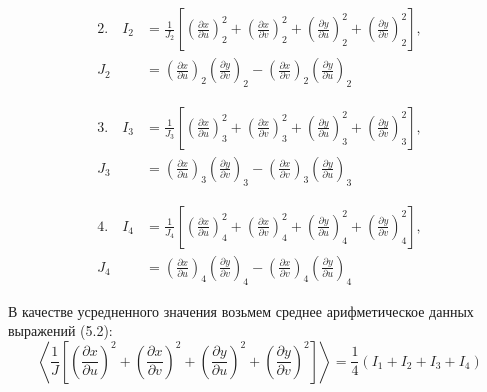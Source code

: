 \documentclass[a4paper,14pt,russian]{extreport}
\renewcommand{\_}{\kern-1.5pt\textunderscore\kern-1.5pt}
\begin{document}
\begin{align}
2. \quad I_2 &= \frac{1}{J_2}\left[\left(\frac{\partial x}{\partial u}\right)_2^2 + \left(\frac{\partial x}{\partial v}\right)_2^2 + \left(\frac{\partial y}{\partial u}\right)_2^2 + \left(\frac{\partial y}{\partial v}\right)_2^2\right], \\
J_2 &= \left(\frac{\partial x}{\partial u}\right)_2\left(\frac{\partial y}{\partial v}\right)_2 - \left(\frac{\partial x}{\partial v}\right)_2\left(\frac{\partial y}{\partial u}\right)_2
\end{align}

\begin{align}
3. \quad I_3 &= \frac{1}{J_3}\left[\left(\frac{\partial x}{\partial u}\right)_3^2 + \left(\frac{\partial x}{\partial v}\right)_3^2 + \left(\frac{\partial y}{\partial u}\right)_3^2 + \left(\frac{\partial y}{\partial v}\right)_3^2\right], \\
J_3 &= \left(\frac{\partial x}{\partial u}\right)_3\left(\frac{\partial y}{\partial v}\right)_3 - \left(\frac{\partial x}{\partial v}\right)_3\left(\frac{\partial y}{\partial u}\right)_3
\end{align}

\begin{align}
4. \quad I_4 &= \frac{1}{J_4}\left[\left(\frac{\partial x}{\partial u}\right)_4^2 + \left(\frac{\partial x}{\partial v}\right)_4^2 + \left(\frac{\partial y}{\partial u}\right)_4^2 + \left(\frac{\partial y}{\partial v}\right)_4^2\right], \\
J_4 &= \left(\frac{\partial x}{\partial u}\right)_4\left(\frac{\partial y}{\partial v}\right)_4 - \left(\frac{\partial x}{\partial v}\right)_4\left(\frac{\partial y}{\partial u}\right)_4
\end{align}


В качестве усредненного значения возьмем среднее арифметическое данных выражений (5.2):
\begin{equation}
\left\langle\frac{1}{J}\left[\left(\frac{\partial x}{\partial u}\right)^2 + \left(\frac{\partial x}{\partial v}\right)^2 + \left(\frac{\partial y}{\partial u}\right)^2 + \left(\frac{\partial y}{\partial v}\right)^2\right]\right\rangle = \frac{1}{4}\left(I_1 + I_2 + I_3 + I_4\right)
\end{equation}
\end{document}
